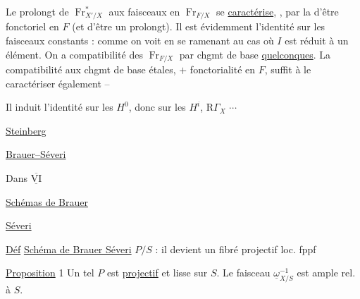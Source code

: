 Le prolongt de $\operatorname{Fr}_{X'/X}^*$  aux faisceaux en $\operatorname{Fr}_{F/X}$ se \uline{caractérise}, , par la  d'être fonctoriel en $F$ (et d'être un prolongt). Il est évidemment l'identité sur les faisceaux constants :
comme on voit en se ramenant au cas où $I$ est réduit à un élément. On a  compatibilité des $\operatorname{Fr}_{F/X}$ par chgmt de base \uline{quelconques}. La compatibilité aux chgmt de base étales, $+$ fonctorialité en $F$, suffit à le caractériser également -- 

Il induit l'identité sur les $H^0$, donc sur les $H^i$, $\mathrm R\Gamma_X$ $\cdots$



\uline{Steinberg}

\uline{Brauer--Séveri}

Dans  $\overline{\underline{\mathrm{VI}}}$

\unsure{\S}\quad{} \uline{Schémas de Brauer}

\uline{Séveri}

\uline{Déf} \uline{Schéma de Brauer Séveri}  $P/S$ : il devient un fibré projectif loc. fppf


\uline{Proposition} 1 Un tel $P$ est \uline{projectif} et lisse sur $S$. Le faisceau \deleted{\unsure{\Omega}} $\underline\omega_{X/S}^{-1}$ est ample rel. à $S$.

